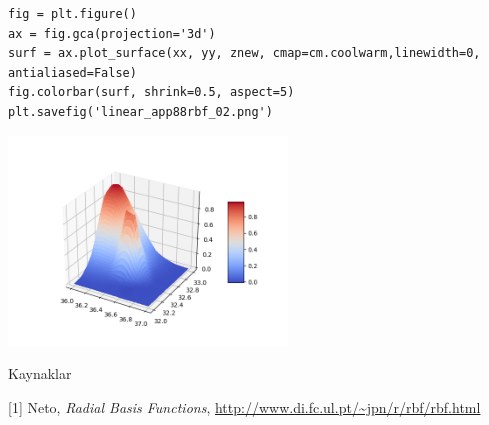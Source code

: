 \documentclass[12pt,fleqn]{article}\usepackage{../../common}
\begin{document}
\begin{verbatim}
fig = plt.figure()
ax = fig.gca(projection='3d')
surf = ax.plot_surface(xx, yy, znew, cmap=cm.coolwarm,linewidth=0, antialiased=False)
fig.colorbar(surf, shrink=0.5, aspect=5)
plt.savefig('linear_app88rbf_02.png')
\end{verbatim}

\includegraphics[width=20em]{linear_app88rbf_02.png}











Kaynaklar

[1] Neto, {\em Radial Basis Functions}, \url{http://www.di.fc.ul.pt/~jpn/r/rbf/rbf.html}
\end{document}
